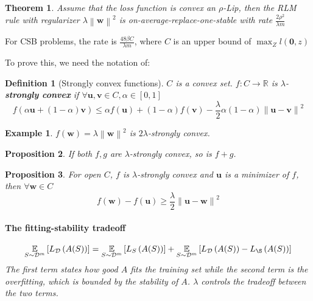 \documentclass{book}
\newcommand{\R}{\mathbb{R}}
\newcommand{\D}{\mathcal{D}}
\newtheorem{Thm}{Theorem}[section]
\newtheorem{Prop}[Thm]{Proposition}
\newtheorem{Def}{Definition}[section]
\newtheorem{Eg}{Example}[section]
\begin{document}
\begin{Thm}
  Assume that the loss function is convex an $\rho$-Lip, then the RLM rule with regularizer $\lambda \left\| \mathbf{w} \right\|^2 $ is on-average-replace-one-stable with rate $\frac{2\rho^2}{\lambda m}$
\end{Thm}

For CSB problems, the rate is $\frac{48\beta C}{\lambda m}$, where $C$ is an upper bound of $\max_Z l(\mathbf{0},z)$

To prove this, we need the notation of:

\begin{Def}[Strongly convex functions]
  $C$ is a convex set. $f:C\to\R$ is $\lambda$-\textbf{strongly convex} if $\forall \mathbf{u},\mathbf{v}\in C, \alpha\in[0,1]$ 
\begin{equation}
f(\alpha \mathbf{u}+(1-\alpha)\mathbf{v})\leq \alpha f(\mathbf{u})+(1-\alpha)f(\mathbf{v})-\frac{\lambda}{2}\alpha(1-\alpha)\left\| \mathbf{u}-\mathbf{v} \right\|^{2} 
\end{equation}
\end{Def}
\begin{Eg}
  $f(\mathbf{w})=\lambda \left\| \mathbf{w} \right\|^{2}$ is $2\lambda$-strongly convex.
\end{Eg}
\begin{Prop}
  If both $f,g$ are $\lambda$-strongly convex, so is $f+g$.
\end{Prop}
\begin{Prop}
  For open $C$, $f$ is $\lambda$-strongly convex and $\mathbf{u}$ is a minimizer of $f$, then $\forall \bm{w}\in C$ 
\begin{equation*}
f(\bm{w})-f(\bm{u})\geq \frac{\lambda}{2}\left\| \bm{u}-\bm{w} \right\|^2
\end{equation*}

\paragraph{The fitting-stability tradeoff}
\begin{equation*}
\underset{S\sim \D^{m}}{\mathbb{E}}\left[ L_{\D}\left( A(S)\right)\right]=\underset{S\sim \D^{m}}{\mathbb{E}}\left[ L_{S}\left( A(S)\right)\right]+\underset{S\sim \D^{m}}{\mathbb{E}}\left[ L_{\D}\left( A(S)\right)-L_{\S}\left( A(S)\right)\right]
\end{equation*}
The first term states how good $A$ fits the training set while the second term is the overfitting, which is bounded by the stability of $A$. $\lambda$ controls the tradeoff between the two terms.  
\end{Prop}
\end{document}
